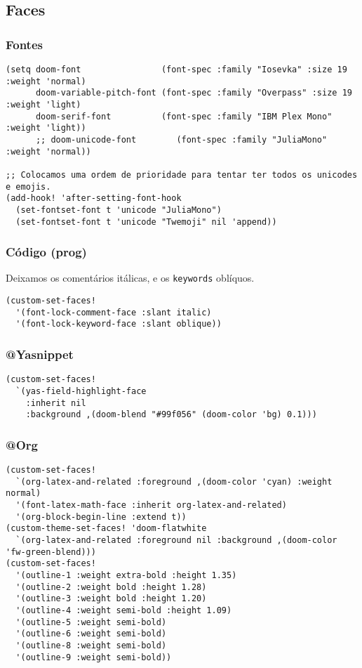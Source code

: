 \documentclass[11pt]{article}
\begin{document}
\subsection{Faces}
\label{sec:org9f19b59}
\subsubsection{Fontes}
\label{sec:orgedaa4e9}

\begin{verbatim}
(setq doom-font                (font-spec :family "Iosevka" :size 19 :weight 'normal)
      doom-variable-pitch-font (font-spec :family "Overpass" :size 19 :weight 'light)
      doom-serif-font          (font-spec :family "IBM Plex Mono" :weight 'light))
      ;; doom-unicode-font        (font-spec :family "JuliaMono" :weight 'normal))

;; Colocamos uma ordem de prioridade para tentar ter todos os unicodes e emojis.
(add-hook! 'after-setting-font-hook
  (set-fontset-font t 'unicode "JuliaMono")
  (set-fontset-font t 'unicode "Twemoji" nil 'append))
\end{verbatim}

\subsubsection{Código (prog)}
\label{sec:orgbc4606a}
Deixamos os comentários itálicas, e os \texttt{keywords} oblíquos.

\begin{verbatim}
(custom-set-faces!
  '(font-lock-comment-face :slant italic)
  '(font-lock-keyword-face :slant oblique))
\end{verbatim}

\subsubsection{@Yasnippet}
\label{sec:org64b28da}
\begin{verbatim}
(custom-set-faces!
  `(yas-field-highlight-face
    :inherit nil
    :background ,(doom-blend "#99f056" (doom-color 'bg) 0.1)))
\end{verbatim}
\subsubsection{@Org}
\label{sec:org42d8e0d}
\begin{verbatim}
(custom-set-faces!
  `(org-latex-and-related :foreground ,(doom-color 'cyan) :weight normal)
  '(font-latex-math-face :inherit org-latex-and-related)
  '(org-block-begin-line :extend t))
(custom-theme-set-faces! 'doom-flatwhite
  `(org-latex-and-related :foreground nil :background ,(doom-color 'fw-green-blend)))
(custom-set-faces!
  '(outline-1 :weight extra-bold :height 1.35)
  '(outline-2 :weight bold :height 1.28)
  '(outline-3 :weight bold :height 1.20)
  '(outline-4 :weight semi-bold :height 1.09)
  '(outline-5 :weight semi-bold)
  '(outline-6 :weight semi-bold)
  '(outline-8 :weight semi-bold)
  '(outline-9 :weight semi-bold))
\end{verbatim}
\end{document}
